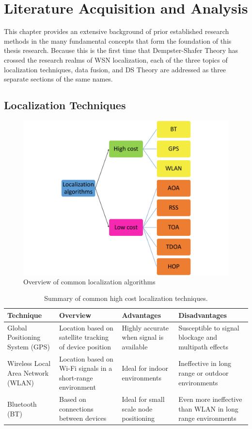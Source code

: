 \documentclass[12pt]{uthesis-v12}  %
\renewcommand{\arraystretch}{1.2}
\begin{document}
\chapter{Literature Acquisition and Analysis}

This chapter provides an extensive background of prior established research methods in the many fundamental concepts that form the foundation of this thesis research. Because this is the first time that Dempster-Shafer Theory has crossed the research realms of WSN localization, each of the three topics of localization techniques, data fusion, and DS Theory are addressed as three separate sections of the same names.

\section{Localization Techniques}

\begin{figure}[!t]
\centering
\includegraphics[width=5in]{algs}
\caption{Overview of common localization algorithms}
\label{algs}
\end{figure}

\begin{table}
\renewcommand{\arraystretch}{1.3}
\caption{Summary of common high cost localization techniques.}
\label{hclt}
\centering
\begin{tabular}{L{3cm} L{3.5cm} L{3.5cm} L{3.5cm}}
\toprule
Technique & Overview & Advantages & Disadvantages \\ \midrule
Global Positioning System (GPS) & Location based on satellite tracking of device position & Highly accurate when signal is available & Susceptible to signal blockage and multipath effects \\ 
Wireless Local Area Network (WLAN) & Location based on Wi-Fi signals in a short-range environment & Ideal for indoor environments & Ineffective in long range or outdoor environments \\ 
Bluetooth (BT) & Based on connections between devices & Ideal for small scale node positioning & Even more ineffective than WLAN in long range environments \\ \bottomrule
\end{tabular}
\end{table}
\end{document}
